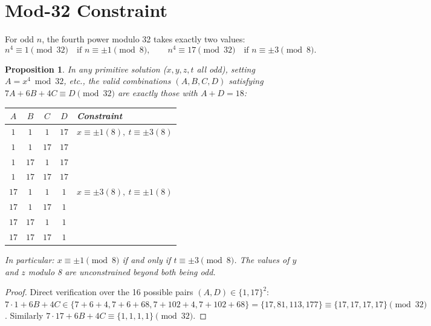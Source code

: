 \documentclass[12pt, a4paper]{article}
\newtheorem{proposition}[theorem]{Proposition}
\theoremstyle{definition}
\begin{document}
\section{Mod-32 Constraint}

For odd $n$, the fourth power modulo 32 takes exactly two values:
\[
  n^4 \equiv 1 \pmod{32} \quad \text{if } n \equiv \pm 1 \pmod{8},
  \qquad
  n^4 \equiv 17 \pmod{32} \quad \text{if } n \equiv \pm 3 \pmod{8}.
\]

\begin{proposition}\label{prop:mod32}
  In any primitive solution ($x,y,z,t$ all odd), setting $A = x^4 \bmod 32$, etc.,
  the valid combinations $(A,B,C,D)$ satisfying $7A + 6B + 4C \equiv D \pmod{32}$
  are exactly those with $A + D = 18$:
  \begin{center}
  \begin{tabular}{cccc|l}
    \toprule
    $A$ & $B$ & $C$ & $D$ & Constraint \\
    \midrule
    $1$  & $1$  & $1$  & $17$ & $x \equiv \pm1(8),\ t \equiv \pm3(8)$ \\
    $1$  & $1$  & $17$ & $17$ & \\
    $1$  & $17$ & $1$  & $17$ & \\
    $1$  & $17$ & $17$ & $17$ & \\
    $17$ & $1$  & $1$  & $1$  & $x \equiv \pm3(8),\ t \equiv \pm1(8)$ \\
    $17$ & $1$  & $17$ & $1$  & \\
    $17$ & $17$ & $1$  & $1$  & \\
    $17$ & $17$ & $17$ & $1$  & \\
    \bottomrule
  \end{tabular}
  \end{center}
  In particular: $x \equiv \pm 1 \pmod{8}$ if and only if $t \equiv \pm 3 \pmod{8}$.
  The values of $y$ and $z$ modulo 8 are unconstrained beyond both being odd.
\end{proposition}

\begin{proof}
Direct verification over the 16 possible pairs $(A,D) \in \{1,17\}^2$:
$7 \cdot 1 + 6B + 4C \in \{7+6+4, 7+6+68, 7+102+4, 7+102+68\}
= \{17, 81, 113, 177\} \equiv \{17,17,17,17\} \pmod{32}$.
Similarly $7 \cdot 17 + 6B + 4C \equiv \{1,1,1,1\} \pmod{32}$.
\end{proof}
\end{document}
